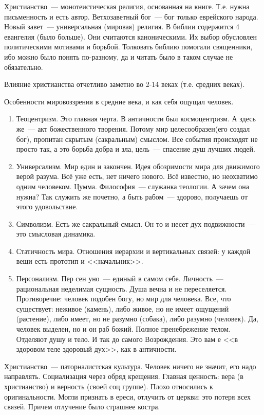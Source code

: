 Христианство~--- монотеистическая религия, основанная на книге. Т.е. нужна письменность и есть автор.
Ветхозаветный бог~--- бог только еврейского народа.
Новый завет~--- универсальная (мировая) религия.
В библии содержится 4 евангелия (было больше). Они считаются каноническими. Их выбор обусловлен политическими мотивами и борьбой. Толковать библию помогали священники, ибо можно было понять по-разному, да и читать было в таком случае не обязательно.

Влияние христианства отчетливо заметно во 2-14 веках (т.е. средних веках).

Особенности мировоззрения в средние века, и как себя ощущал человек.

\begin{enumerate}
	\item Теоцентризм. Это главная черта. В античности был космоцентризм. А здесь же~--- акт божественного творения. Потому мир целесообразен(его создал бог), пропитан скрытым (сакральным) смыслом. Все события происходят не просто так, а это борьба добра и зла, цель~--- спасение душ лучших людей.
	\item Универсализм. Мир един и закончен. Идея обозримости мира для движимого верой разума. Всё уже есть, нет ничего нового. Всё известно, но неохватимо одним человеком. Цумма. Философия~--- служанка теологии. А зачем она нужна? Так служить же почетно, а быть рабом~--- здорово, получаешь от этого удовольствие.
	\item Символизм. Есть же сакральный смысл. Он то и несет дух подвижности~--- это смысловая динамика.
	\item Статичность мира. Отношения иерархии и вертикальных связей: у каждой вещи есть прототип и <<начальник>>.
	\item Персонализм. Пер сен уно~--- единый в самом себе. Личность~--- рациональная неделимая сущность. Душа вечна и не переселяется. Противоречие: человек подобен богу, но мир для человека. Все, что существует: неживое (камень), либо живое, но не имеет ощущений (растение), либо имеет, но не разумно (собака), либо разумно (человек). Да, человек выделен, но и он раб божий. Полное пренебрежение телом. Отделяют душу и тело. И так до самого Возрождения. Это вам е <<в здоровом теле здоровый дух>>, как в античности.
\end{enumerate}

Христианство~--- паторналистская культура.
Человек ничего не значит, его надо направлять.
Социализация через обряд крещения.
Главная ценность: вера (в христианство) и верность (своей соц группе).
Плохо относились к оригинальности. Могли признать в ереси, отлучить от церкви: это потеря всех связей. Причем отлучение было страшнее костра.


